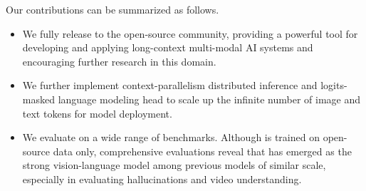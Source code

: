 Our contributions can be summarized as follows.
\begin{itemize}
\item
%
We fully release \OurMethod to the open-source community, providing a powerful tool for developing and applying long-context multi-modal AI systems and encouraging further research in this domain.

\item
%
We further implement context-parallelism distributed inference and logits-masked language modeling head to scale up the infinite number of image and text tokens for model deployment.
%


\item 
%
We evaluate \OurMethod on a wide range of benchmarks.
%
Although \OurMethod is trained on open-source data only, comprehensive evaluations reveal that \OurMethod has emerged as the strong vision-language model among previous models of similar scale, especially in evaluating hallucinations and video understanding.
%

\end{itemize}

